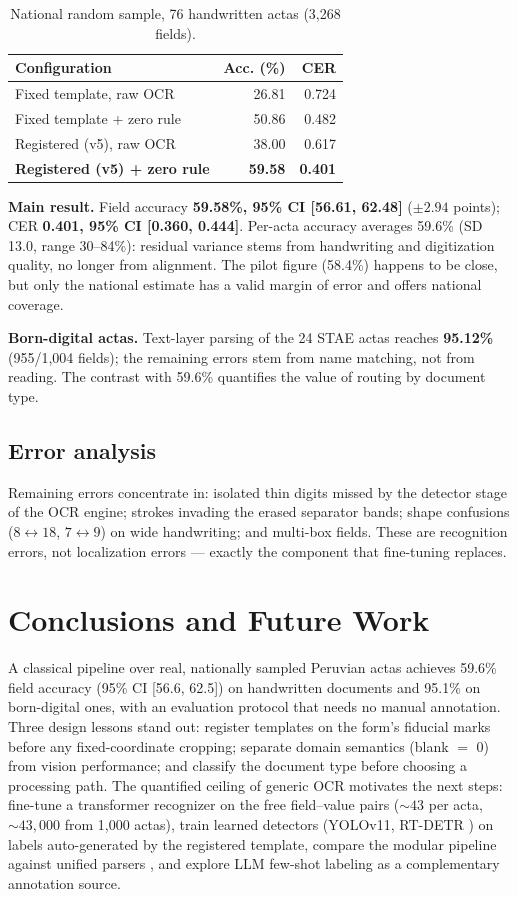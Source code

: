 \documentclass[conference]{IEEEtran}
\begin{document}
\begin{table}[t]
\caption{National random sample, 76 handwritten actas (3,268 fields).}
\label{tab:national}
\centering
\begin{tabular}{lrr}
\toprule
Configuration & Acc. (\%) & CER \\
\midrule
Fixed template, raw OCR & 26.81 & 0.724 \\
Fixed template + zero rule & 50.86 & 0.482 \\
Registered (v5), raw OCR & 38.00 & 0.617 \\
\textbf{Registered (v5) + zero rule} & \textbf{59.58} & \textbf{0.401} \\
\bottomrule
\end{tabular}
\end{table}

\textbf{Main result.} Field accuracy \textbf{59.58\%, 95\% CI [56.61, 62.48]}
($\pm 2.94$ points); CER \textbf{0.401, 95\% CI [0.360, 0.444]}. Per-acta
accuracy averages 59.6\% (SD 13.0, range 30--84\%): residual variance stems
from handwriting and digitization quality, no longer from alignment. The
pilot figure (58.4\%) happens to be close, but only the national estimate
has a valid margin of error and offers national coverage.

\textbf{Born-digital actas.} Text-layer parsing of the 24 STAE actas reaches
\textbf{95.12\%} (955/1,004 fields); the remaining errors stem from
name matching, not from reading. The contrast with 59.6\% quantifies the value of routing by
document type.

\subsection{Error analysis}
Remaining errors concentrate in: isolated thin digits missed by the detector
stage of the OCR engine; strokes invading the erased separator bands;
shape confusions ($8{\leftrightarrow}18$, $7{\leftrightarrow}9$) on wide
handwriting; and multi-box fields. These are recognition errors, not
localization errors --- exactly the component that fine-tuning replaces.

\section{Conclusions and Future Work}
A classical pipeline over real, nationally sampled Peruvian actas achieves
59.6\% field accuracy (95\% CI [56.6, 62.5]) on handwritten documents and
95.1\% on born-digital ones, with an evaluation protocol that needs no manual
annotation. Three design lessons stand out: register templates on the form's
fiducial marks before any fixed-coordinate cropping; separate domain
semantics (blank $=$ 0) from vision performance; and classify the document
type before choosing a processing path. The quantified ceiling of generic
OCR motivates the next steps: fine-tune a transformer recognizer
\cite{trocr,dtrocr} on the free field--value pairs (${\sim}43$ per acta,
${\sim}43{,}000$ from 1,000 actas), train learned detectors (YOLOv11,
RT-DETR \cite{rtdetr}) on labels auto-generated by the registered template,
compare the modular pipeline against unified parsers \cite{omniparser,donut},
and explore LLM few-shot labeling as a complementary annotation source.
\end{document}
